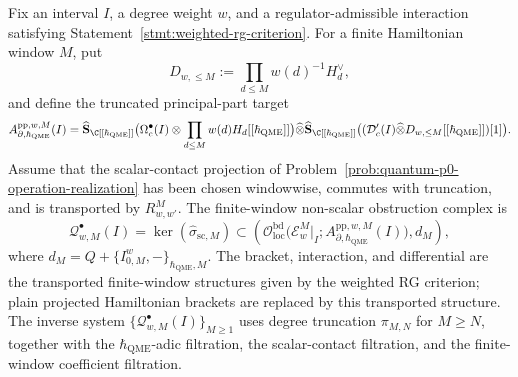 \begin{defn}
\label{defn:wt-nonscalar-qme-tower}
  Fix an interval \(I\), a degree weight \(w\), and a
  regulator-admissible interaction satisfying
  Statement~\ref{stmt:weighted-rg-criterion}.  For a finite
  Hamiltonian window \(M\), put
  \[
    D_{w,\leq M}:=\prod_{d\leq M}w(d)^{-1}H_d^\vee,
  \]
  and define the truncated principal-part target
  \[
  \begin{aligned}
    A_{\partial,\hbar_{\mathrm{QME}}}^{\mathrm{pp},w,M}(I)
      =
      \widehat{\mathbf S}_{\C[[\hbar_{\mathrm{QME}}]]}
      \bigl(\Omega^\bullet_c(I)\otimes\prod_{d\leq M}w(d)H_d[[\hbar_{\mathrm{QME}}]]\bigr)
      \widehat\otimes
      \widehat{\mathbf S}_{\C[[\hbar_{\mathrm{QME}}]]}
      \bigl((\mathcal D'_c(I)\widehat\otimes
        D_{w,\leq M}[[\hbar_{\mathrm{QME}}]])[1]\bigr).
  \end{aligned}
  \]
  Assume that the scalar-contact projection of
  Problem~\ref{prob:quantum-p0-operation-realization} has been chosen
  windowwise, commutes with truncation, and is transported by
  \(R^M_{w,w'}\).  The finite-window non-scalar obstruction complex is
  \[
    \mathcal Q^\bullet_{w,M}(I)
      =
      \ker(\widehat\sigma_{\mathrm{sc},M})
      \subset
      \left(
        \mathcal O_{\mathrm{loc}}^{\mathrm{bd}}\bigl(
          \mathcal E_w^M|_I;
          A_{\partial,\hbar_{\mathrm{QME}}}^{\mathrm{pp},w,M}(I)\bigr),
        d_M
      \right),
  \]
  where
  \(d_M=Q+\{I^w_{0,M},-\}_{\hbar_{\mathrm{QME}},M}\).  The bracket, interaction, and
  differential are the transported finite-window structures given by
	  the weighted RG criterion; plain projected Hamiltonian brackets are
  replaced by this transported structure.
  The inverse system
  \(\{\mathcal Q^\bullet_{w,M}(I)\}_{M\geq1}\) uses degree truncation
  \(\pi_{M,N}\) for \(M\geq N\), together with the \(\hbar_{\mathrm{QME}}\)-adic
  filtration, the scalar-contact filtration, and the finite-window
  coefficient filtration.
\end{defn}

